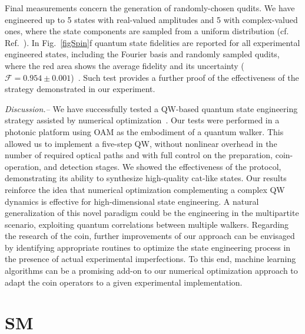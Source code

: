 Final measurements concern the generation of randomly-chosen qudits. We have engineered up to 5 states with real-valued amplitudes and 5 with complex-valued ones, where the state components are sampled from a uniform distribution (cf. Ref.~\cite{SI}).
In Fig.~\ref{figSpin}f quantum state fidelities are reported for all experimental engineered states, including the Fourier basis and randomly sampled qudits, where the red area shows the average fidelity and its uncertainty ($\mathcal{F}{=}0.954 \pm 0.001$)~\cite{SI}. Such test provides a further proof of the effectiveness of the strategy demonstrated in our experiment.

\textit{Discussion.--} We have successfully tested a QW-based quantum state engineering strategy assisted by numerical optimization~\cite{innocenti2017quantum}. Our tests were performed in a photonic platform using OAM as the embodiment of a quantum walker. This allowed us to implement a five-step QW, without nonlinear overhead in the number of required optical paths and with full control on the preparation, coin-operation, and detection stages. We showed the effectiveness of the protocol, demonstrating its ability to synthesize high-quality cat-like states. Our results reinforce the idea that numerical optimization complementing a complex QW dynamics is effective for high-dimensional state engineering. A natural generalization of this novel paradigm could be the engineering in the multipartite scenario, exploiting quantum correlations between multiple walkers. Regarding the research of the coin, further improvements of our approach can be envisaged by identifying appropriate routines to optimize the state engineering process in the presence of actual experimental imperfections. To this end, machine learning algorithms can be a promising add-on to our numerical optimization approach to adapt the coin operators to a given experimental implementation.

\section{SM}

